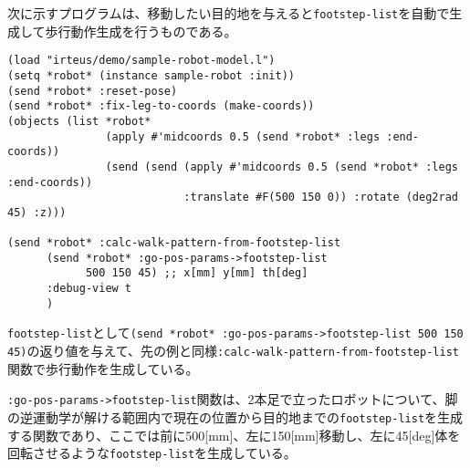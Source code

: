 次に示すプログラムは、移動したい目的地を与えると\verb|footstep-list|を自動で生成して歩行動作生成を行うものである。
{\baselineskip=10pt
\begin{verbatim}
(load "irteus/demo/sample-robot-model.l")
(setq *robot* (instance sample-robot :init))
(send *robot* :reset-pose)
(send *robot* :fix-leg-to-coords (make-coords))
(objects (list *robot*
               (apply #'midcoords 0.5 (send *robot* :legs :end-coords))
               (send (send (apply #'midcoords 0.5 (send *robot* :legs :end-coords))
                           :translate #F(500 150 0)) :rotate (deg2rad 45) :z)))

(send *robot* :calc-walk-pattern-from-footstep-list
      (send *robot* :go-pos-params->footstep-list
            500 150 45) ;; x[mm] y[mm] th[deg]
      :debug-view t
      )
\end{verbatim}
}
\verb|footstep-list|として\verb|(send *robot* :go-pos-params->footstep-list 500 150 45)|の返り値を与えて、先の例と同様\verb|:calc-walk-pattern-from-footstep-list|関数で歩行動作を生成している。

\verb|:go-pos-params->footstep-list|関数は、2本足で立ったロボットについて、脚の逆運動学が解ける範囲内で現在の位置から目的地までの\verb|footstep-list|を生成する関数であり、ここでは前に500[mm]、左に150[mm]移動し、左に45[deg]体を回転させるような\verb|footstep-list|を生成している。

  
